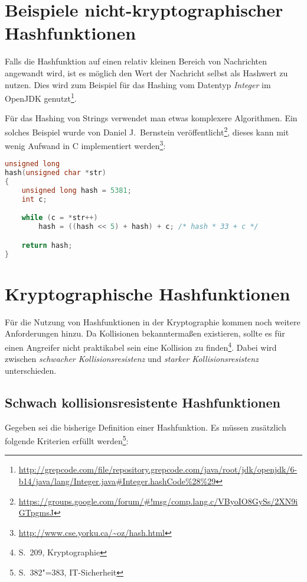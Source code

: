 \section{Beispiele nicht-kryptographischer Hashfunktionen}

Falls die Hashfunktion auf einen relativ kleinen Bereich von
Nachrichten angewandt wird, ist es möglich den Wert der Nachricht
selbst als Hashwert zu nutzen.  Dies wird zum Beispiel für das Hashing
vom Datentyp \emph{Integer} im OpenJDK
genutzt\footnote{\url{http://grepcode.com/file/repository.grepcode.com/java/root/jdk/openjdk/6-b14/java/lang/Integer.java\#Integer.hashCode\%28\%29}}.

Für das Hashing von Strings verwendet man etwas komplexere
Algorithmen.  Ein solches Beispiel wurde von Daniel J.~Bernstein
veröffentlicht\footnote{\url{https://groups.google.com/forum/\#!msg/comp.lang.c/VByoIO8GySs/2XN9iGTpgmsJ}},
dieses kann mit wenig Aufwand in C implementiert werden\footnote{\url{http://www.cse.yorku.ca/~oz/hash.html}}:

\begin{lstlisting}[language=C,basicstyle=\ttfamily\footnotesize,keywordstyle=\bfseries\color{black},captionpos=b,caption={djb2}]
unsigned long
hash(unsigned char *str)
{
    unsigned long hash = 5381;
    int c;

    while (c = *str++)
        hash = ((hash << 5) + hash) + c; /* hash * 33 + c */

    return hash;
}
\end{lstlisting}

\section{Kryptographische Hashfunktionen}

Für die Nutzung von Hashfunktionen in der Kryptographie kommen noch
weitere Anforderungen hinzu.  Da Kollisionen bekanntermaßen
existieren, sollte es für einen Angreifer nicht praktikabel sein eine
Kollision zu finden\footnote{S.~209, Kryptographie}.  Dabei wird
zwischen \emph{schwacher Kollisionsresistenz} und \emph{starker
  Kollisionsresistenz} unterschieden.

\subsection{Schwach kollisionsresistente Hashfunktionen}

Gegeben sei die bisherige Definition einer Hashfunktion.  Es müssen
zusätzlich folgende Kriterien erfüllt werden\footnote{S.~382"=383,
  IT-Sicherheit}:

